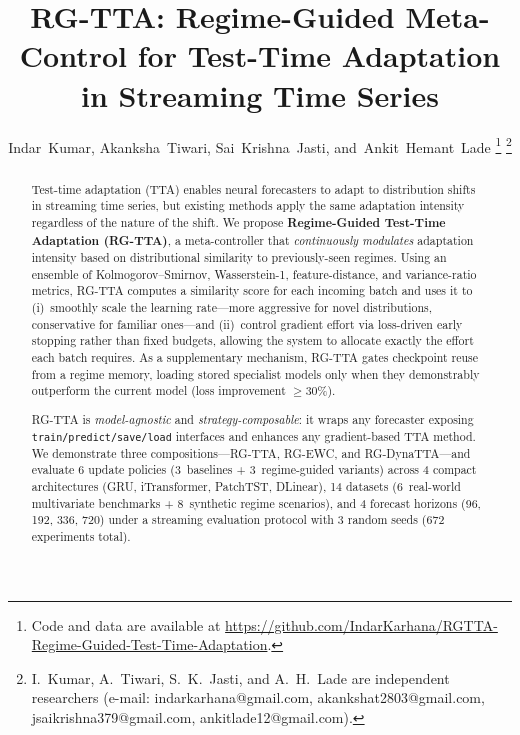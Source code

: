 \documentclass[journal]{IEEEtran}
\newcommand{\repourl}{\url{https://github.com/IndarKarhana/RGTTA-Regime-Guided-Test-Time-Adaptation}}
\begin{document}
\title{RG-TTA: Regime-Guided Meta-Control for Test-Time Adaptation in Streaming Time Series}

\author{Indar~Kumar,
Akanksha~Tiwari,
Sai~Krishna~Jasti,
and~Ankit~Hemant~Lade%
\thanks{Code and data are available at \repourl.}%
\thanks{I.~Kumar, A.~Tiwari, S.~K.~Jasti, and A.~H.~Lade are independent researchers
(e-mail: indarkarhana@gmail.com, akankshat2803@gmail.com,
jsaikrishna379@gmail.com, ankitlade12@gmail.com).}}

\maketitle

\begin{abstract}

Test-time adaptation (TTA) enables neural forecasters to adapt to distribution shifts in streaming time series, but existing methods apply the same adaptation intensity regardless of the nature of the shift. We propose \textbf{Regime-Guided Test-Time Adaptation (RG-TTA)}, a meta-controller that \emph{continuously modulates} adaptation intensity based on distributional similarity to previously-seen regimes. Using an ensemble of Kolmogorov--Smirnov, Wasserstein-1, feature-distance, and variance-ratio metrics, RG-TTA computes a similarity score for each incoming batch and uses it to (i)~smoothly scale the learning rate---more aggressive for novel distributions, conservative for familiar ones---and (ii)~control gradient effort via loss-driven early stopping rather than fixed budgets, allowing the system to allocate exactly the effort each batch requires. As a supplementary mechanism, RG-TTA gates checkpoint reuse from a regime memory, loading stored specialist models only when they demonstrably outperform the current model (loss improvement $\geq$30\%).

RG-TTA is \emph{model-agnostic} and \emph{strategy-composable}: it wraps any forecaster exposing \texttt{train/predict/save/load} interfaces and enhances any gradient-based TTA method. We demonstrate three compositions---RG-TTA, RG-EWC, and RG-DynaTTA---and evaluate 6 update policies (3~baselines + 3~regime-guided variants) across 4 compact architectures (GRU, iTransformer, PatchTST, DLinear), 14 datasets (6~real-world multivariate benchmarks + 8~synthetic regime scenarios), and 4 forecast horizons (96, 192, 336, 720) under a streaming evaluation protocol with 3 random seeds (672 experiments total).


\end{abstract}
\end{document}
